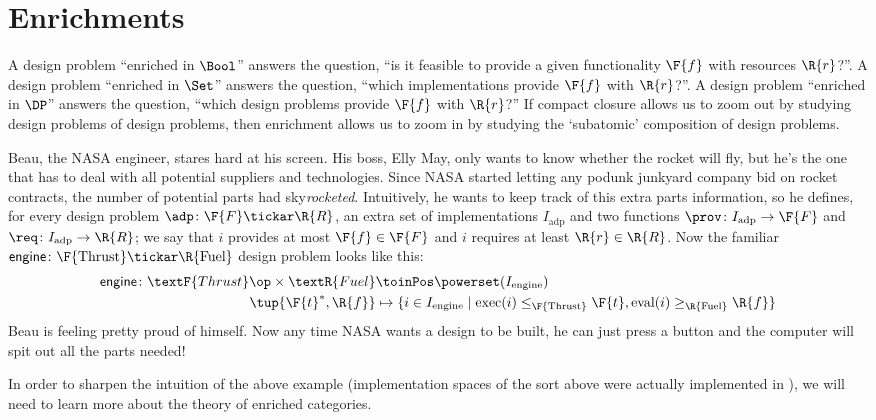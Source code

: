 \section{Enrichments}
\label{sec:enriched}
A design problem ``enriched in $\Bool$'' answers the question, ``is it feasible to provide a given functionality $\F{f}$ with resources $\R{r}$?''.  A design problem ``enriched in $\Set$'' answers the question, ``which implementations provide $\F{f}$ with $\R{r}$?''. A design problem ``enriched in $\DP$'' answers the question, ``which design problems provide $\F{f}$ with $\R{r}$?'' If compact closure allows us to zoom out by studying design problems of design problems, then enrichment allows us to zoom in by studying the `subatomic' composition of design problems.

\begin{example}\label{ex:dpi_example}
Beau, the NASA engineer, stares hard at his screen. His boss, Elly May, only wants to know whether the rocket will fly, but he's the one that has to deal with all potential suppliers and technologies. Since NASA started letting any podunk junkyard company bid on rocket contracts, the number of potential parts had sky\emph{rocketed}. Intuitively, he wants to keep track of this extra parts information, so he defines, for every design problem $\adp \colon \F{F} \tickar \R{R}$, an extra set of implementations $I_\text{adp}$ and two functions $\prov\colon I_\text{adp} \to \F{F}$ and  $\req\colon I_\text{adp} \to \R{R}$; we say that $i$ provides at most $\F{f} \in \F{F}$ and $i$ requires at least $\R{r} \in \R{R}$. Now the familiar $\mathsf{engine} \colon \F{\text{Thrust}} \tickar \R{\text{Fuel}}$ design problem looks like this:
\begin{equation}
\begin{aligned}
\mathsf{engine} \colon \textF{Thrust}\op \times \textR{Fuel} &\toinPos \powerset(I_\text{engine}) \\
\tup{\F{t}^*,\R{f}} &\mapsto \{ i \in I_\text{engine} \mid \text{exec}(i) \leq_\F{\text{Thrust}} \F{t}, \text{eval}(i) \geq_\R{\text{Fuel}} \R{f} \}
\end{aligned}
\end{equation}
Beau is feeling pretty proud of himself. Now any time NASA wants a design to be built, he can just press a button and the computer will spit out all the parts needed!
\end{example}

In order to sharpen the intuition of the above example (implementation spaces of the sort above were actually implemented in \cite{censi}), we will need to learn more about the theory of enriched categories.

